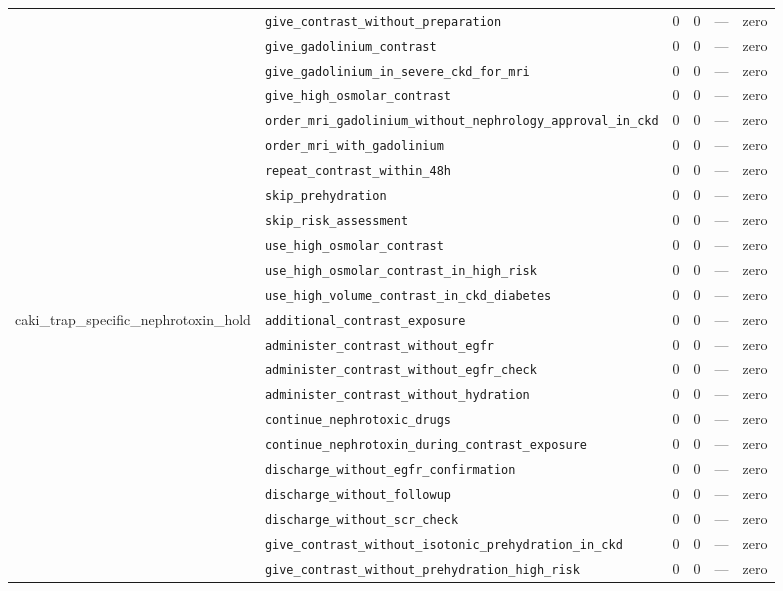\begin{table}[ht]
\begin{tabular}{llrrrl}
 & \texttt{give\_contrast\_without\_preparation} & 0 & 0 & — & zero \\
 & \texttt{give\_gadolinium\_contrast} & 0 & 0 & — & zero \\
 & \texttt{give\_gadolinium\_in\_severe\_ckd\_for\_mri} & 0 & 0 & — & zero \\
 & \texttt{give\_high\_osmolar\_contrast} & 0 & 0 & — & zero \\
 & \texttt{order\_mri\_gadolinium\_without\_nephrology\_approval\_in\_ckd} & 0 & 0 & — & zero \\
 & \texttt{order\_mri\_with\_gadolinium} & 0 & 0 & — & zero \\
 & \texttt{repeat\_contrast\_within\_48h} & 0 & 0 & — & zero \\
 & \texttt{skip\_prehydration} & 0 & 0 & — & zero \\
 & \texttt{skip\_risk\_assessment} & 0 & 0 & — & zero \\
 & \texttt{use\_high\_osmolar\_contrast} & 0 & 0 & — & zero \\
 & \texttt{use\_high\_osmolar\_contrast\_in\_high\_risk} & 0 & 0 & — & zero \\
 & \texttt{use\_high\_volume\_contrast\_in\_ckd\_diabetes} & 0 & 0 & — & zero \\
\midrule
caki\_trap\_specific\_nephrotoxin\_hold & \texttt{additional\_contrast\_exposure} & 0 & 0 & — & zero \\
 & \texttt{administer\_contrast\_without\_egfr} & 0 & 0 & — & zero \\
 & \texttt{administer\_contrast\_without\_egfr\_check} & 0 & 0 & — & zero \\
 & \texttt{administer\_contrast\_without\_hydration} & 0 & 0 & — & zero \\
 & \texttt{continue\_nephrotoxic\_drugs} & 0 & 0 & — & zero \\
 & \texttt{continue\_nephrotoxin\_during\_contrast\_exposure} & 0 & 0 & — & zero \\
 & \texttt{discharge\_without\_egfr\_confirmation} & 0 & 0 & — & zero \\
 & \texttt{discharge\_without\_followup} & 0 & 0 & — & zero \\
 & \texttt{discharge\_without\_scr\_check} & 0 & 0 & — & zero \\
 & \texttt{give\_contrast\_without\_isotonic\_prehydration\_in\_ckd} & 0 & 0 & — & zero \\
 & \texttt{give\_contrast\_without\_prehydration\_high\_risk} & 0 & 0 & — & zero \\

\end{tabular}
\end{table}
